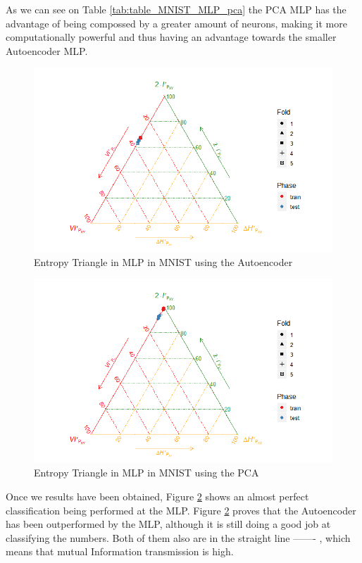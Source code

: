 \documentclass[12pt]{report}
\begin{document}
As we can see on Table \ref{tab:table_MNIST_MLP_pca} the PCA MLP has the advantage of being compossed by a greater amount of neurons, making it more computationally powerful and thus having an advantage towards the smaller Autoencoder MLP. 

	
\begin{figure}[H]
		\centering
		\includegraphics[width=1\linewidth]{Figuras_tfg/MNIST_Autoencoder_mlp}
		\caption{Entropy Triangle in MLP in MNIST using the Autoencoder}
		\label{fig:figure_MLP_MNIST_ET_Auto}
	\end{figure}

\begin{figure}[H]
	\centering
	\includegraphics[width=1\linewidth]{Figuras_tfg/MNIST_PCA_mlp}
	\caption{Entropy Triangle in MLP in MNIST using the PCA}
	\label{fig:figure_MLP_MNIS_ET_PCA}
\end{figure}

Once we results have been obtained, Figure \ref{fig:figure_MLP_MNIS_ET_PCA} shows an almost perfect classification being performed at the MLP. Figure \ref{fig:figure_MLP_MNIS_ET_PCA} proves that the Autoencoder has been outperformed by the MLP, although it is still doing a good job at classifying the numbers. Both of them also are in the straight line ------- , which means that mutual Information transmission is high.
\end{document}

